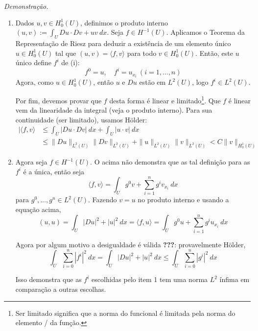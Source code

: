 \documentclass[a4paper, 11pt]{book}
\begin{document}
\textit{Demonstração.} 
\begin{enumerate}
	\item Dados $u,v \in H^1_0(U)$, definimos o produto interno $(u,v):= \int_U Du\cdot Dv + uv\ dx$. Seja $f \in H^{-1}(U)$. Aplicamos o Teorema da Representação de Riesz para deduzir a existência de um elemento único $u \in H^1_0(U)$ tal que $(u,v)=\langle f, v \rangle$ para todo $v \in H^1_0(U)$. Então, este $u$ único define $f^i$ de (i):\[
	f^0=u, \quad f^i = u_{x_i} \ (i = 1,\dots,n)
	\]
	Agora, como $u \in H^1_0(U)$, então $u$ e $Du$ estão em $L^2(U)$, logo $f^i \in L^2(U)$.

	Por fim, devemos provar que $f$ desta forma é linear e limitado\footnote{Ser limitado significa que a norma do funcional é limitada pela norma do elemento / da função.}. Que $f$ é linear vem da linearidade da integral (veja o produto interno). Para sua continuidade (ser limitado), usamos Hölder:
	\begin{align*}
		| \langle f, v \rangle  &\leq \int_U | Du \cdot Dv | \ dx + \int_U | u \cdot v | \ dx  \\
		&\leq \|Du\|_{L^2(U)}\|Dv\|_{L^2(U)} + \|u\|_{L^2(U)}\|v\|_{L^2(U)} < C \|v\|_{H^1_0(U)}
	\end{align*}	

	\item Agora seja $f \in H^{-1}(U)$. O acima não demonstra que as tal definição para as $f^i$ é a única, então seja \[
	\langle f, v \rangle = \int_{U} g^0 v + \sum_{i=1}^{n}g^i v_{x_i}\ dx	
	\]
	para $g^0, \dots, g^n \in L^2(U)$. Fazendo $v=u$ no produto interno e usando a equação acima, \[
	(u,u) = \int_U |Du|^2 + |u|^2 \ dx = \langle f, u \rangle = \int_U g^0u + \sum_{i=1}^{n}g^i u_{x_i}\ dx 
	\]

	Agora por algum motivo a desigualdade é válida \textbf{???}: provavelmente Hölder, \[
		\int_U \sum_{i=0}^{n} |f^i|^2 \ dx = \int_U |Du|^2 + |u|^2 \ dx \leq \int_U \sum_{i=0}^{n} |g^i|^2 \ dx
	\]

	Isso demonstra que as $f^i$ escolhidas pelo item 1 tem uma norma $L^2$ ínfima em comparação a outras escolhas.


\end{enumerate}
\end{document}
